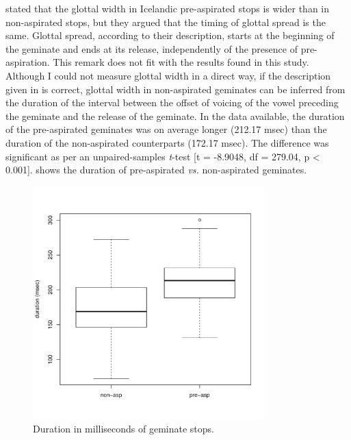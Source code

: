 \documentclass[11pt,a4paper,oneside,openany]{memoir}\usepackage[]{graphicx}\usepackage[]{color}
\newenvironment{knitrout}{}{} %
\begin{document}
\citet[pp. 70--71]{ladefoged1996} stated that the glottal width in Icelandic pre-aspirated stops is wider than in non-aspirated stops, but they argued that the timing of glottal spread is the same.
Glottal spread, according to their description, starts at the beginning of the geminate and ends at its release, independently of the presence of pre-aspiration. 
This remark does not fit with the results found in this study.
Although I could not measure glottal width in a direct way, if the description given in \citet{ladefoged1996} is correct, glottal width in non-aspirated geminates can be inferred from the duration of the interval between the offset of voicing of the vowel preceding the geminate and the release of the geminate.
In the data available, the duration of the pre-aspirated geminates was on average longer (212.17 msec) than the duration of the non-aspirated counterparts (172.17 msec).
The difference was significant as per an unpaired-samples \textit{t}-test [t = -8.9048, df = 279.04, p < 0.001].
 shows the duration of pre-aspirated \textit{vs.} non-aspirated geminates.


\begin{figure}
\centering
\begin{knitrout}
\color{fgcolor}
\includegraphics[width=0.8\textwidth]{img/geminates-duration-1} 

\end{knitrout}
\caption{Duration in milliseconds of geminate stops.
}
\label{f:geminatedur}
\end{figure}
\end{document}
